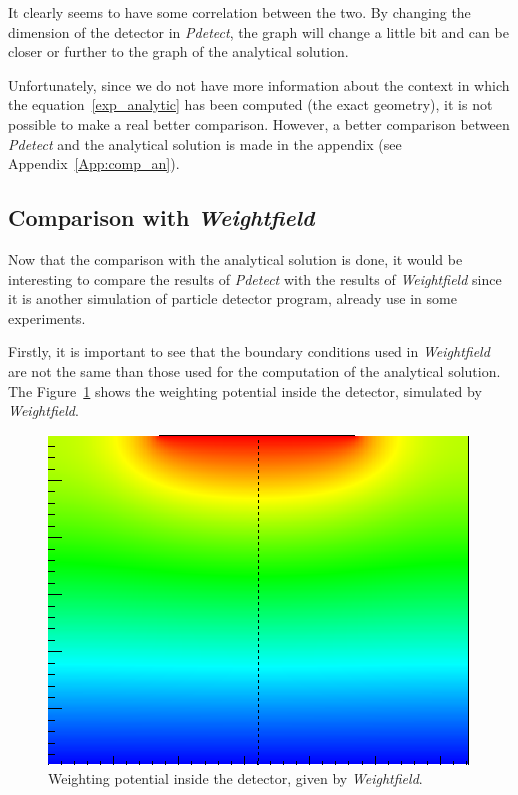 \documentclass[11pt]{article}
\begin{document}
		It clearly seems to have some correlation between the two. By changing the dimension of the detector
		in \textit{Pdetect}, the graph will change a little bit and can be closer or further to the graph of the
		analytical solution.

		Unfortunately, since we do not have more information about the context in which the equation~\ref{exp_analytic}
		has been computed (the exact geometry), it is not possible to make a real better comparison. However,
		a better comparison between \textit{Pdetect} and the analytical solution is made in the appendix (see
		Appendix~\ref{App:comp_an}).

	\subsection{Comparison with \textit{Weightfield}}

		Now that the comparison with the analytical solution is done, it would be interesting to compare the results
		of \textit{Pdetect} with the results of \textit{Weightfield} since it is another simulation of particle detector
		program, already use in some experiments.

		Firstly, it is important to see that the boundary conditions used in \textit{Weightfield} are not the same
		than those used for the computation of the analytical solution. The Figure~\ref{fig:weight_free} shows
		the weighting potential inside the detector, simulated by \textit{Weightfield}.

		\begin{figure}[H]
			\center
			\includegraphics[scale=0.45]{images/boundary_conditions/detector/weight_free.png}
			\caption{Weighting potential inside the detector, given by \textit{Weightfield}.}
			\label{fig:weight_free}
		\end{figure}
\end{document}
